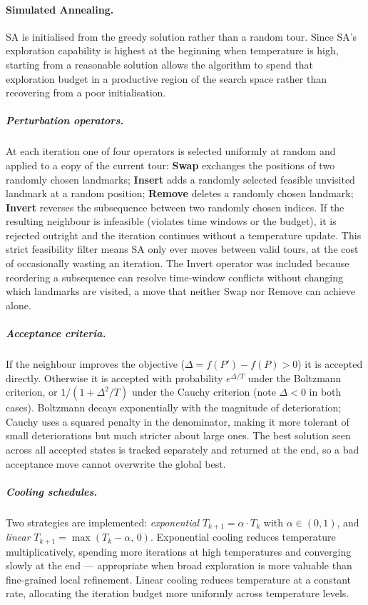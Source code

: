\paragraph{Simulated Annealing.}

SA is initialised from the greedy solution rather than a random tour. Since SA's exploration capability is highest at the beginning when temperature is high, starting from a reasonable solution allows the algorithm to spend that exploration budget in a productive region of the search space rather than recovering from a poor initialisation.

\subparagraph{Perturbation operators.}
At each iteration one of four operators is selected uniformly at random and applied to a copy of the current tour: \textbf{Swap} exchanges the positions of two randomly chosen landmarks; \textbf{Insert} adds a randomly selected feasible unvisited landmark at a random position; \textbf{Remove} deletes a randomly chosen landmark; \textbf{Invert} reverses the subsequence between two randomly chosen indices. If the resulting neighbour is infeasible (violates time windows or the budget), it is rejected outright and the iteration continues without a temperature update. This strict feasibility filter means SA only ever moves between valid tours, at the cost of occasionally wasting an iteration. The Invert operator was included because reordering a subsequence can resolve time-window conflicts without changing which landmarks are visited, a move that neither Swap nor Remove can achieve alone.

\subparagraph{Acceptance criteria.}
If the neighbour improves the objective ($\Delta = f(P') - f(P) > 0$) it is accepted directly. Otherwise it is accepted with probability $e^{\Delta/T}$ under the Boltzmann criterion, or $1/(1 + \Delta^2/T)$ under the Cauchy criterion (note $\Delta < 0$ in both cases). Boltzmann decays exponentially with the magnitude of deterioration; Cauchy uses a squared penalty in the denominator, making it more tolerant of small deteriorations but much stricter about large ones. The best solution seen across all accepted states is tracked separately and returned at the end, so a bad acceptance move cannot overwrite the global best.

\subparagraph{Cooling schedules.}
Two strategies are implemented: \emph{exponential} $T_{k+1} = \alpha \cdot T_k$ with $\alpha \in (0,1)$, and \emph{linear} $T_{k+1} = \max(T_k - \alpha,\,0)$. Exponential cooling reduces temperature multiplicatively, spending more iterations at high temperatures and converging slowly at the end --- appropriate when broad exploration is more valuable than fine-grained local refinement. Linear cooling reduces temperature at a constant rate, allocating the iteration budget more uniformly across temperature levels.

